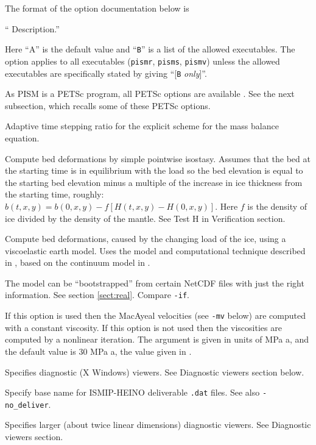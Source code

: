 \documentclass[12pt,final]{amsart}
\renewcommand{\t}[1]{\texttt{#1}}
\begin{document}
The format of the option documentation below is

\centerline{`` Description.''}

\noindent Here ``A'' is the default value and ``\t{B}'' is a list of the allowed executables.  The option applies to all executables (\verb|pismr|, \verb|pisms|, \verb|pismv|) unless the allowed executables are specifically stated by giving ``[\t{B} \textsl{only}]''.

As PISM is a PETSc program, all PETSc options are available \cite{petsc-user-ref}.  See the next subsection, which recalls some of these PETSc options.
\bigskip

  Adaptive time stepping ratio for the explicit scheme for the mass balance equation.

 Compute bed deformations by simple pointwise isostasy.  Assumes that the bed at the starting time is in equilibrium with the load so the bed elevation is equal to the starting bed elevation minus a multiple of the increase in ice thickness from the starting time, roughly: $b(t,x,y) = b(0,x,y) - f [H(t,x,y) - H(0,x,y)]$.  Here $f$ is the density of ice divided by the density of the mantle.  See Test H in Verification section.

 Compute bed deformations, caused by the changing load of the ice, using a viscoelastic earth model.  Uses the model and computational technique described in \cite{BLKfastearth}, based on the continuum model in \cite{LingleClark}.

  The model can be ``bootstrapped'' from certain NetCDF files with just the right information.  See section \ref{sect:real}.  Compare \verb|-if|.

  If this option is used then the MacAyeal velocities (see \verb|-mv| below) are computed with a constant viscosity.  If this option is not used then the viscosities are computed by a nonlinear iteration.  The argument is given in units of MPa a, and the default value is $30$ MPa a, the value given in \cite{Ritzetal2001}.

  Specifies diagnostic (X Windows) viewers.  See Diagnostic viewers section below.

  Specify base name for ISMIP-HEINO deliverable \verb|.dat| files.  See also \verb|-no_deliver|.

  Specifies larger (about twice linear dimensions) diagnostic viewers.  See Diagnostic viewers section.
\end{document}
